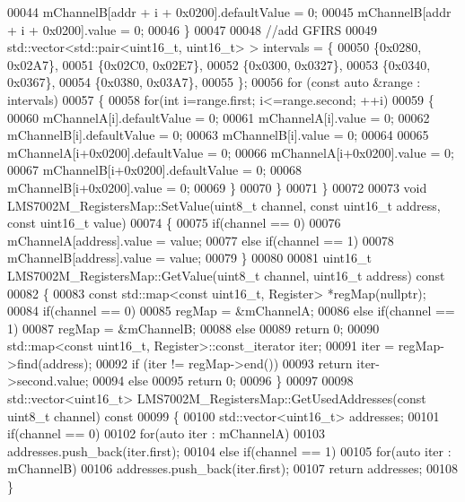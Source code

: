 \begin{DoxyCode}
00044         mChannelB[addr + i + 0x0200].defaultValue = 0;
00045         mChannelB[addr + i + 0x0200].value = 0;
00046     \}
00047 
00048     \textcolor{comment}{//add GFIRS}
00049     std::vector<std::pair<uint16\_t, uint16\_t> > intervals = \{
00050         \{0x0280, 0x02A7\},
00051         \{0x02C0, 0x02E7\},
00052         \{0x0300, 0x0327\},
00053         \{0x0340, 0x0367\},
00054         \{0x0380, 0x03A7\},
00055     \};
00056     \textcolor{keywordflow}{for} (\textcolor{keyword}{const} \textcolor{keyword}{auto} &range : intervals)
00057     \{
00058         \textcolor{keywordflow}{for}(\textcolor{keywordtype}{int} i=range.first; i<=range.second; ++i)
00059         \{
00060             mChannelA[i].defaultValue = 0;
00061             mChannelA[i].value = 0;
00062             mChannelB[i].defaultValue = 0;
00063             mChannelB[i].value = 0;
00064 
00065             mChannelA[i+0x0200].defaultValue = 0;
00066             mChannelA[i+0x0200].value = 0;
00067             mChannelB[i+0x0200].defaultValue = 0;
00068             mChannelB[i+0x0200].value = 0;
00069         \}
00070     \}
00071 \}
00072 
00073 \textcolor{keywordtype}{void} LMS7002M_RegistersMap::SetValue(uint8\_t channel, \textcolor{keyword}{const} uint16\_t address, \textcolor{keyword}{const} uint16\_t value)
00074 \{
00075     \textcolor{keywordflow}{if}(channel == 0)
00076         mChannelA[address].value = value;
00077     \textcolor{keywordflow}{else} \textcolor{keywordflow}{if}(channel == 1)
00078         mChannelB[address].value = value;
00079 \}
00080 
00081 uint16\_t LMS7002M_RegistersMap::GetValue(uint8\_t channel, uint16\_t address)\textcolor{keyword}{ const}
00082 \textcolor{keyword}{}\{
00083     \textcolor{keyword}{const} std::map<const uint16\_t, Register> *regMap(\textcolor{keyword}{nullptr});
00084     \textcolor{keywordflow}{if}(channel == 0)
00085         regMap = &mChannelA;
00086     \textcolor{keywordflow}{else} \textcolor{keywordflow}{if}(channel == 1)
00087         regMap = &mChannelB;
00088     \textcolor{keywordflow}{else}
00089         \textcolor{keywordflow}{return} 0;
00090     std::map<const uint16\_t, Register>::const\_iterator iter;
00091     iter = regMap->find(address);
00092     \textcolor{keywordflow}{if} (iter != regMap->end())
00093         \textcolor{keywordflow}{return} iter->second.value;
00094     \textcolor{keywordflow}{else}
00095         \textcolor{keywordflow}{return} 0;
00096 \}
00097 
00098 std::vector<uint16\_t> LMS7002M_RegistersMap::GetUsedAddresses(\textcolor{keyword}{const} uint8\_t channel)\textcolor{keyword}{ const}
00099 \textcolor{keyword}{}\{
00100     std::vector<uint16\_t> addresses;
00101     \textcolor{keywordflow}{if}(channel == 0)
00102         \textcolor{keywordflow}{for}(\textcolor{keyword}{auto} iter : mChannelA)
00103             addresses.push\_back(iter.first);
00104     \textcolor{keywordflow}{else} \textcolor{keywordflow}{if}(channel == 1)
00105         \textcolor{keywordflow}{for}(\textcolor{keyword}{auto} iter : mChannelB)
00106             addresses.push\_back(iter.first);
00107     \textcolor{keywordflow}{return} addresses;
00108 \}
\end{DoxyCode}
